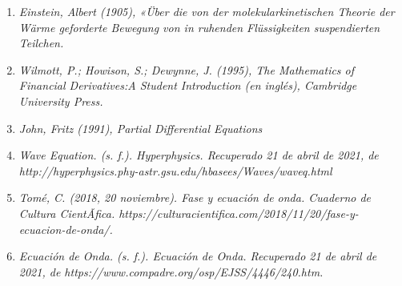 \documentclass[12pt]{article}
\begin{document}
\begin{enumerate}
\item \textit{Einstein, Albert (1905), «Über die von der molekularkinetischen Theorie der Wärme geforderte Bewegung von in ruhenden Flüssigkeiten suspendierten Teilchen.}

\item \textit{Wilmott, P.; Howison, S.; Dewynne, J. (1995), The Mathematics of Financial Derivatives:A Student Introduction (en inglés), Cambridge University Press.}

\item \textit{John, Fritz (1991), Partial Differential Equations}

\item \textit{Wave Equation. (s. f.). Hyperphysics. Recuperado 21 de abril de 2021, de http://hyperphysics.phy-astr.gsu.edu/hbasees/Waves/waveq.html}

\item \textit{Tomé, C. (2018, 20 noviembre). Fase y ecuación de onda. Cuaderno de Cultura CientÃ­fica. https://culturacientifica.com/2018/11/20/fase-y-ecuacion-de-onda/.}

\item \textit{Ecuación de Onda. (s. f.). Ecuación de Onda. Recuperado 21 de abril de 2021, de https://www.compadre.org/osp/EJSS/4446/240.htm.}

\end{enumerate}
\end{document}

